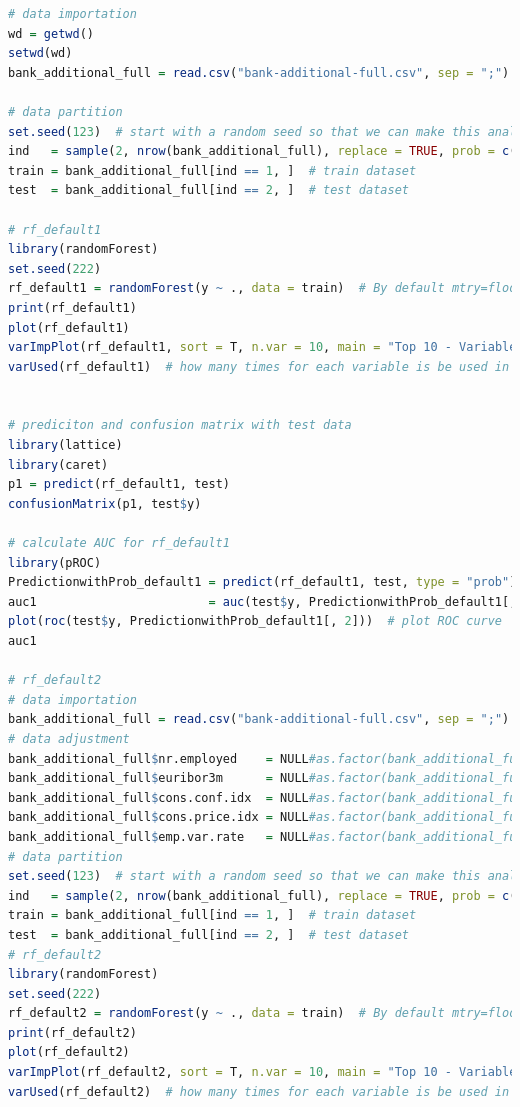 \documentclass[12pt, a4paper, bibliography=totoc, english]{scrartcl}
\begin{document}
\begin{lstlisting}[language = R]
# data importation
wd = getwd()
setwd(wd)
bank_additional_full = read.csv("bank-additional-full.csv", sep = ";")

# data partition
set.seed(123)  # start with a random seed so that we can make this analysis repeatable 
ind   = sample(2, nrow(bank_additional_full), replace = TRUE, prob = c(0.8, 0.2))  # divide the dataset into two parts
train = bank_additional_full[ind == 1, ]  # train dataset
test  = bank_additional_full[ind == 2, ]  # test dataset

# rf_default1
library(randomForest)
set.seed(222)
rf_default1 = randomForest(y ~ ., data = train)  # By default mtry=floor(sqrt(ncol(x)))  ntree = 500
print(rf_default1)
plot(rf_default1)
varImpPlot(rf_default1, sort = T, n.var = 10, main = "Top 10 - Variable Importance")  # showing the importance of the variables in plot
varUsed(rf_default1)  # how many times for each variable is be used in the tuned random forest model


# prediciton and confusion matrix with test data
library(lattice)
library(caret)
p1 = predict(rf_default1, test)
confusionMatrix(p1, test$y)

# calculate AUC for rf_default1
library(pROC)
PredictionwithProb_default1 = predict(rf_default1, test, type = "prob")
auc1                        = auc(test$y, PredictionwithProb_default1[, 2])
plot(roc(test$y, PredictionwithProb_default1[, 2]))  # plot ROC curve
auc1

# rf_default2
# data importation
bank_additional_full = read.csv("bank-additional-full.csv", sep = ";")
# data adjustment
bank_additional_full$nr.employed    = NULL#as.factor(bank_additional_full$nr.employed)
bank_additional_full$euribor3m      = NULL#as.factor(bank_additional_full$euribor3m)
bank_additional_full$cons.conf.idx  = NULL#as.factor(bank_additional_full$cons.conf.idx)
bank_additional_full$cons.price.idx = NULL#as.factor(bank_additional_full$cons.price.idx)
bank_additional_full$emp.var.rate   = NULL#as.factor(bank_additional_full$emp.var.rate)
# data partition
set.seed(123)  # start with a random seed so that we can make this analysis repeatable 
ind   = sample(2, nrow(bank_additional_full), replace = TRUE, prob = c(0.8, 0.2))  # divide the dataset into two parts
train = bank_additional_full[ind == 1, ]  # train dataset
test  = bank_additional_full[ind == 2, ]  # test dataset
# rf_default2
library(randomForest)
set.seed(222)
rf_default2 = randomForest(y ~ ., data = train)  # By default mtry=floor(sqrt(ncol(x)))  ntree = 500
print(rf_default2)
plot(rf_default2)
varImpPlot(rf_default2, sort = T, n.var = 10, main = "Top 10 - Variable Importance")  # showing the importance of the variables in plot
varUsed(rf_default2)  # how many times for each variable is be used in the tuned random forest model


\end{lstlisting}
\end{document}
